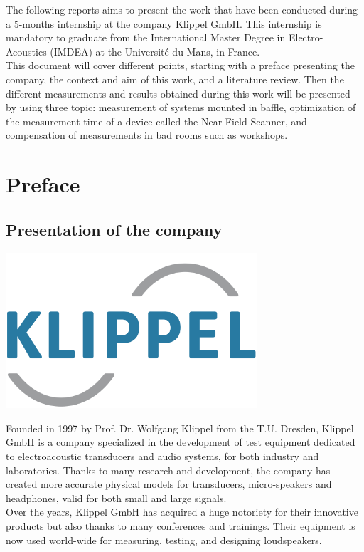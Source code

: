 \documentclass{report}
\begin{document}

The following reports aims to present the work that have been conducted during a 5-months internship at the company Klippel GmbH. This internship is mandatory to graduate from the International Master Degree in Electro-Acoustics (IMDEA) at the Université du Mans, in France. \\

This document will cover different points, starting with a preface presenting the company, the context and aim of this work, and a literature review. Then the different measurements and results obtained during this work will be presented by using three topic: measurement of systems mounted in baffle, optimization of the measurement time of a device called the Near Field Scanner, and compensation of measurements in bad rooms such as workshops. 


\chapter{Preface}

    
\section{Presentation of the company}

\begin{minipage}{0.35\textwidth}
\centering
	\includegraphics[width=0.7\textwidth]{Preface/logo_klippel} 
    \captionsetup{hypcap=false} 
	\label{fig:lolo_klippel}
\end{minipage}
\begin{minipage}{0.65\textwidth}
Founded in 1997 by Prof. Dr. Wolfgang Klippel from the T.U. Dresden, Klippel GmbH is a company specialized in the development of test equipment dedicated to electroacoustic transducers and audio systems, for both industry and laboratories. Thanks to many research and development, the company has created more accurate physical models for transducers, micro-speakers and headphones, valid for both small and large signals.  \\
Over the years, Klippel GmbH has acquired a huge notoriety for their innovative products but also thanks to many conferences and trainings. Their equipment is now used world-wide for measuring, testing, and designing loudspeakers.
\end{minipage}
\end{document}
